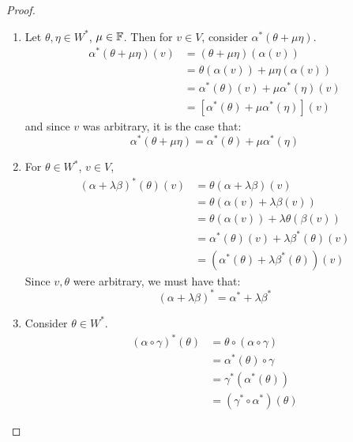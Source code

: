 \documentclass[../Main.tex]{subfiles}
\begin{document}
\begin{proof}
    \begin{enumerate}
        \item Let $\theta, \eta \in W^*$, $\mu \in \mathbb{F}$. Then for $v \in V$, consider $\alpha^*(\theta + \mu \eta)$.
            \begin{align*}
                \alpha^*(\theta + \mu \eta)(v) &= (\theta + \mu \eta)(\alpha(v)) \\
                &= \theta(\alpha(v)) + \mu \eta(\alpha(v)) \\
                &= \alpha^*(\theta)(v) + \mu \alpha^*(\eta)(v) \\
                &= \left[\alpha^*(\theta) + \mu \alpha^*(\eta)\right](v)
            \end{align*}
            and since $v$ was arbitrary, it is the case that:
            \begin{equation*}
                \alpha^*(\theta + \mu \eta) = \alpha^*(\theta) + \mu \alpha^*(\eta)
            \end{equation*}
        \item For $\theta \in W^*$, $v \in V$,
            \begin{align*}
                (\alpha + \lambda \beta)^*(\theta)(v) &= \theta(\alpha + \lambda \beta)(v) \\
                &= \theta(\alpha(v) + \lambda \beta(v)) \\
                &= \theta(\alpha(v)) + \lambda\theta(\beta(v)) \\
                &= \alpha^*(\theta)(v) + \lambda\beta^*(\theta)(v) \\
                &= (\alpha^*(\theta) + \lambda \beta^*(\theta))(v)
            \end{align*}
            Since $v, \theta$ were arbitrary, we must have that:
            \begin{equation*}
                (\alpha + \lambda \beta)^* = \alpha^* + \lambda \beta^*
            \end{equation*}
        \item Consider $\theta \in W^*$.
            \begin{align*}
                (\alpha \circ \gamma)^*(\theta) &= \theta \circ (\alpha \circ \gamma) \\
                &= \alpha^*(\theta) \circ \gamma \\
                &= \gamma^*(\alpha^*(\theta)) \\
                &= (\gamma^* \circ \alpha^*)(\theta)

\end{align*}
\end{enumerate}
\end{proof}
\end{document}
